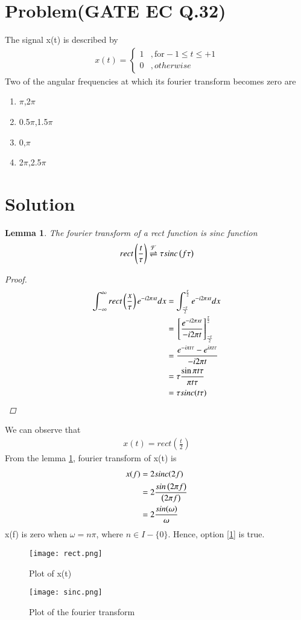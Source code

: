 \documentclass[journal,12pt,twocolumn]{IEEEtran}
\newtheorem{lemma}[theorem]{Lemma}
\begin{document}
\section{Problem(GATE EC Q.32)}
The signal x(t) is described by 
\begin{align}
 x(t)=
\begin{cases}
1 & ,\text{for} -1 \leq t \leq +1\\
0 & ,otherwise
\end{cases} 
\end{align}
Two of the angular frequencies at which its fourier transform becomes zero are 
\begin{enumerate}
\item\label{1} $\pi$,2$\pi$
\item 0.5$\pi$,1.5$\pi$
\item 0,$\pi$
\item 2$\pi$,2.5$\pi$
\end{enumerate}
\section{Solution}
\begin{lemma}\label{eq}
The fourier transform of a rect function is sinc function 
\begin{align}
    rect\left(\frac{t}{\tau}\right) \overset{\mathcal{F}}{ \rightleftharpoons} \tau sinc\left(f\tau\right)
\end{align}
\begin{proof}
\begin{align}
    \int_{-\infty}^{\infty} rect\left(\frac{x}{\tau}\right) e^{-i2\pi xt} dx&= \int_{\frac{-\tau}{2}}^{\frac{\tau}{2}} e^{-i2\pi xt}dx\\
    &={}\left[\frac{e^{-i2\pi xt}}{-i2\pi t}\right]_{\frac{-\tau}{2}}^{\frac{\tau}{2}}\\
    &=\frac{e^{-i\pi t\tau}-e^{i\pi t\tau}}{-i2\pi t}\\
    &=\tau \frac{\sin{\pi t\tau}}{\pi t\tau}\\
    &=\tau sinc(t\tau)
\end{align} 
\end{proof}
\end{lemma}
We can observe that 
\begin{align}
    x(t)=rect(\frac{t}{2})
\end{align}
From the lemma \ref{eq}, fourier transform of x(t) is 
\begin{align}
    x(f)&= 2 sinc(2f)\\ 
        &= 2 \frac{sin\left(2\pi f\right)}{\left(2 \pi f\right)}\\
        &= 2 \frac{sin(\omega)}{\omega}
\end{align}
x(f) is zero when $\omega=n\pi$, where $n\in I-\{0\}$. Hence, option \ref{1} is true.
\begin{figure}[!h]
 \centering
 \texttt{[image: rect.png]}
 \caption{Plot of x(t)}
 \label{plot}
\end{figure}
\begin{figure}[!h]
 \centering
 \texttt{[image: sinc.png]}
 \caption{Plot of the fourier transform}
 \label{plot}
\end{figure}
\end{document}
